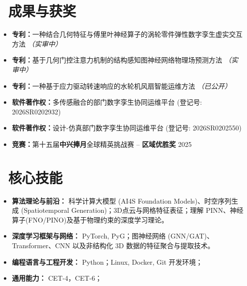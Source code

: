 \documentclass[11pt]{article}
\begin{document}
\section{%
    \makebox[\widthof{\faTrophy}][c]%
    {\color{CVBlue}\faTrophy}\ 成果与获奖%
}

\begin{itemize}
    \item \textbf{专利：}一种结合几何特征与傅里叶神经算子的涡轮零件弹性数字孪生虚实交互方法 \textit{（实审中）}
    \item \textbf{专利：}基于几何门控注意力机制的结构感知图神经网络物理场预测方法 \textit{（实审中）}
    \item \textbf{专利：}一种基于应力驱动转速响应的水轮机风扇智能运维方法 \textit{（已公开）}
    \item \textbf{软件著作权：}多传感融合的部门数字孪生协同运维平台 (登记号: 2026SR0202932)
    \item \textbf{软件著作权：}设计-仿真部门数字孪生协同运维平台 (登记号: 2026SR0202550)
    \item \textbf{竞赛：}第十五届\textbf{中兴捧月}全球精英挑战赛 -- \textbf{区域优胜奖} \hfill 2025
\end{itemize}

\section{\makebox[\widthof{\faCogs}][c]{\color{CVBlue}\faCogs}\ 核心技能}
    
\begin{itemize}
    \item \textbf{算法理论与前沿：} 科学计算大模型 (AI4S Foundation Models)、时空序列生成 (Spatiotemporal Generation)；3D点云与网格特征表征；理解 PINN、神经算子(FNO/PINO)及基于物理约束的深度学习理论。
    \item \textbf{深度学习框架与网络：} PyTorch, PyG；图神经网络 (GNN/GAT)、Transformer、CNN 以及非结构化 3D 数据的特征聚合与提取技术。
    \item \textbf{编程语言与工程开发：} Python；Linux, Docker, Git 开发环境；
    \item \textbf{通用能力：} CET-4，CET-6；
\end{itemize}
\end{document}
